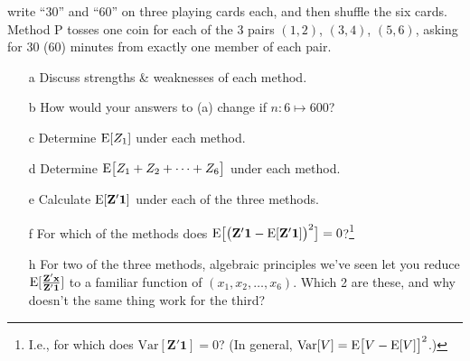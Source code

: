 \documentclass{article}
\begin{document}
\begin{enumerate}
write ``30'' and ``60'' on three playing cards each, and then shuffle
the six cards. Method P tosses one coin for each of the 3 pairs
$(1,2)$, $(3,4)$, $(5,6)$, asking for 30 (60) minutes from exactly one
member of each pair. 
  \begin{minipage}{.45\linewidth}
\begin{itemize}
\item[a] Discuss strengths \& weaknesses of each method.
\item[b] How would your answers to (a) change if $n: 6 \mapsto 600$?
\item[c] Determine $\mathrm{E}[  Z_{1} ]$  under each method.
\item[d] Determine $\mathrm{E}\big[  Z_{1} + Z_{2} + \cdots + Z_{6} \big]$ under each method.
\item[e] Calculate $\mathrm{E}[\mathbf{Z}'\mathbf{1}]$ under each of the three methods.
\end{itemize}
\end{minipage}
% 
\begin{minipage}{.45\linewidth}
  \begin{itemize}
 \item[f] For which of the methods does $\mathrm{E}
  \big[\big(\mathbf{Z}'\mathbf{1} -\mathrm{E} [\mathbf{Z}'\mathbf{1}]\big)^{2}\big] =
  0$?\footnote{I.e., for which does
    $\mathrm{Var}[\mathbf{Z}'\mathbf{1}] = 0$?  (In general,
    $\mathrm{Var}[V] = \mathrm{E} \big[V - \mathrm{E}[V] \big]^{2} $.)}
\item[h] For two of the three methods, algebraic principles we've seen
  let you reduce
  $\mathrm{E} [\frac{\mathbf{Z}'\mathbf{x}}{\mathbf{Z}'\mathbf{1}}]$ to a
  familiar function of $(x_{1}, x_{2}, \ldots, x_{6}) $.  Which 2 are
  these, and why doesn't the same thing work for the third?
\end{itemize}
\end{minipage}
\end{enumerate}
\end{document}
